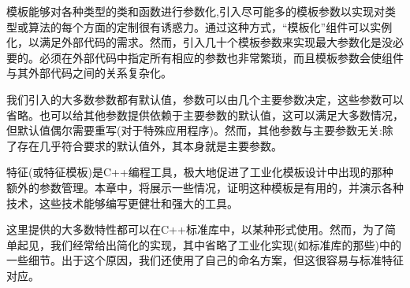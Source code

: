 模板能够对各种类型的类和函数进行参数化,引入尽可能多的模板参数以实现对类型或算法的每个方面的定制很有诱惑力。通过这种方式，“模板化”组件可以实例化，以满足外部代码的需求。然而，引入几十个模板参数来实现最大参数化是没必要的。必须在外部代码中指定所有相应的参数也非常繁琐，而且模板参数会使组件与其外部代码之间的关系复杂化。

我们引入的大多数参数都有默认值，参数可以由几个主要参数决定，这些参数可以省略。也可以给其他参数提供依赖于主要参数的默认值，这可以满足大多数情况，但默认值偶尔需要重写(对于特殊应用程序)。然而，其他参数与主要参数无关:除了存在几乎符合要求的默认值外，其本身就是主要参数。

特征(或特征模板)是C++编程工具，极大地促进了工业化模板设计中出现的那种额外的参数管理。本章中，将展示一些情况，证明这种模板是有用的，并演示各种技术，这些技术能够编写更健壮和强大的工具。

这里提供的大多数特性都可以在C++标准库中，以某种形式使用。然而，为了简单起见，我们经常给出简化的实现，其中省略了工业化实现(如标准库的那些)中的一些细节。出于这个原因，我们还使用了自己的命名方案，但这很容易与标准特征对应。